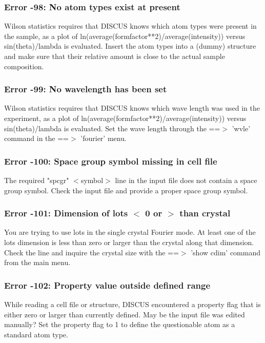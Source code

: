 \subsubsection{Error -98: No atom types exist at present}
\par
Wilson statistics requires that DISCUS knows which atom types were 
present in the sample, as a plot of 
ln(average(formfactor**2)/average(intensity)) versus sin(theta)/lambda 
is evaluated. 
Insert the atom types into a (dummy) structure and make sure that their 
relative amount is close to the actual sample composition. 
\subsubsection{Error -99: No wavelength has been set}
\par
Wilson statistics requires that DISCUS knows which wave length was used 
in the experiment, as a plot of 
ln(average(formfactor**2)/average(intensity)) versus sin(theta)/lambda 
is evaluated. 
Set the wave length through the ==$> $ 'wvle' command in the 
==$> $ 'fourier' menu. 
\subsubsection{Error -100: Space group symbol missing in cell file}
\par
The required "spcgr" $ <$symbol$> $ line in the input file does not contain 
a space group symbol. Check the input file and provide a proper 
space group symbol. 
\subsubsection{Error -101: Dimension of lots $ <$ 0 or $> $ than crystal}
\par
You are trying to use lots in the single crystal Fourier mode. At 
least one of the lots dimension is less than zero or larger than 
the crystal along that dimension. Check the line and inquire the 
crystal size with the ==$> $ 'show cdim' command from the main menu. 
\subsubsection{Error -102: Property value outside defined range}
\par
While reading a cell file or structure, DISCUS encountered a property 
flag that is either zero or larger than currently defined. 
May be the input file was edited manually? Set the property flag to 
1 to define the questionable atom as a standard atom type. 

